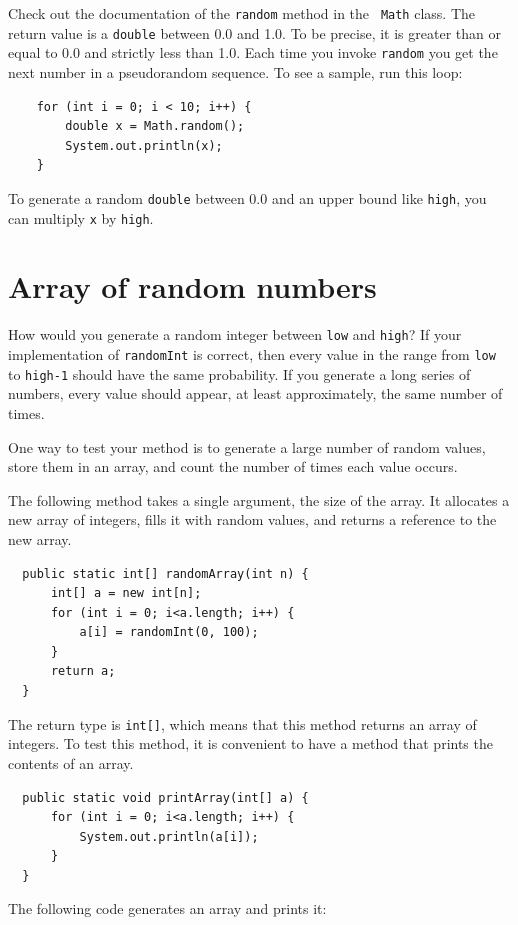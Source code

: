 \documentclass[12pt]{book}
\theoremstyle{exercise}
\begin{document}
Check out the documentation of the {\tt random} method in the {\tt
Math} class.  The return value is a {\tt double} between 0.0 and 1.0.
To be precise, it is greater than or equal to 0.0 and strictly less
than 1.0.  Each time you invoke {\tt random} you get the next
number in a pseudorandom sequence.
To see a sample, run this loop:

\begin{lstlisting}
    for (int i = 0; i < 10; i++) {
        double x = Math.random();
        System.out.println(x);
    }
\end{lstlisting}
%
To generate a random {\tt double} between 0.0 and an upper bound like
{\tt high}, you can multiply {\tt x} by {\tt high}.


\section{Array of random numbers}
\label{randarray}

How would you generate a random integer between {\tt low} and {\tt high}?
If your implementation of {\tt randomInt} is correct, then
every value in the range from {\tt low} to {\tt high-1} should
have the same probability.  If you generate a long series
of numbers, every value should appear, at least approximately,
the same number of times.

One way to test your method is to
generate a large number of random values,
store them in an array, and count the number of times each
value occurs.

The following method takes a single argument, the size of
the array.  It allocates a new array of integers, fills
it with random values, and returns a reference to the new
array.

\begin{lstlisting}
  public static int[] randomArray(int n) {
      int[] a = new int[n];
      for (int i = 0; i<a.length; i++) {
          a[i] = randomInt(0, 100);
      }
      return a;
  }
\end{lstlisting}
%
The return type is {\tt int[]}, which means that
this method returns an array of integers.
To test this method, it is convenient to have a method that
prints the contents of an array.

\begin{lstlisting}
  public static void printArray(int[] a) {
      for (int i = 0; i<a.length; i++) {
          System.out.println(a[i]);
      }
  }
\end{lstlisting}
%
The following code generates an array and prints it:
\end{document}
